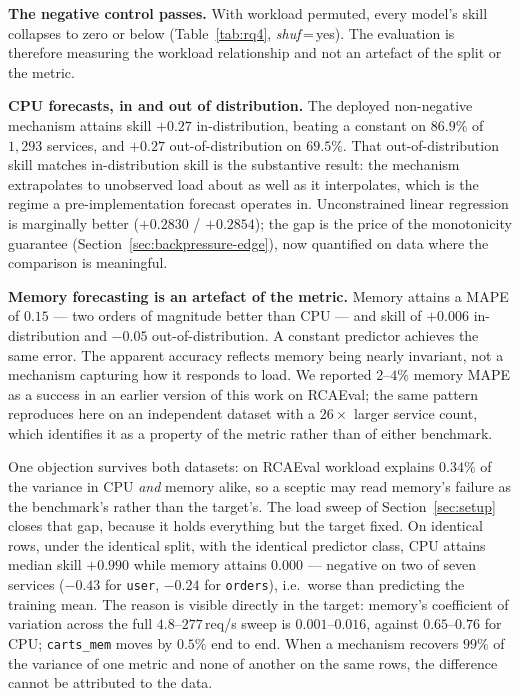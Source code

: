 \documentclass[journal, 10pt]{IEEEtran}
\begin{document}
\textbf{The negative control passes.} With workload permuted, every model's skill
collapses to zero or below (Table~\ref{tab:rq4}, \emph{shuf}\,=\,yes). The
evaluation is therefore measuring the workload relationship and not an artefact
of the split or the metric.

\textbf{CPU forecasts, in and out of distribution.} The deployed non-negative
mechanism attains skill $+0.27$ in-distribution, beating a constant on $86.9\%$
of $1{,}293$ services, and $+0.27$ out-of-distribution on $69.5\%$. That
out-of-distribution skill matches in-distribution skill is the substantive
result: the mechanism extrapolates to unobserved load about as well as it
interpolates, which is the regime a pre-implementation forecast operates in.
Unconstrained linear regression is marginally better ($+0.2830$ / $+0.2854$);
the gap is the price of the monotonicity guarantee (Section~\ref{sec:backpressure-edge}),
now quantified on data where the comparison is meaningful.

\textbf{Memory forecasting is an artefact of the metric.} Memory attains a MAPE
of $0.15$ --- two orders of magnitude better than CPU --- and skill of
$+0.006$ in-distribution and $-0.05$ out-of-distribution. A constant predictor
achieves the same error. The apparent accuracy reflects memory being nearly
invariant, not a mechanism capturing how it responds to load. We reported
$2$--$4\%$ memory MAPE as a success in an earlier version of this work on
RCAEval; the same pattern reproduces here on an independent dataset with a
$26{\times}$ larger service count, which identifies it as a property of the
metric rather than of either benchmark.

One objection survives both datasets: on RCAEval workload explains $0.34\%$ of
the variance in CPU \emph{and} memory alike, so a sceptic may read memory's
failure as the benchmark's rather than the target's. The load sweep of
Section~\ref{sec:setup} closes that gap, because it holds everything but the
target fixed. On identical rows, under the identical split, with the identical
predictor class, CPU attains median skill $+0.990$ while memory attains
$0.000$ --- negative on two of seven services ($-0.43$ for \texttt{user},
$-0.24$ for \texttt{orders}), i.e.\ worse than predicting the training mean.
The reason is visible directly in the target: memory's coefficient of variation
across the full $4.8$--$277\,$req/s sweep is $0.001$--$0.016$, against
$0.65$--$0.76$ for CPU; \texttt{carts\_mem} moves by $0.5\%$ end to end. When a
mechanism recovers $99\%$ of the variance of one metric and none of another on
the same rows, the difference cannot be attributed to the data.
\end{document}
